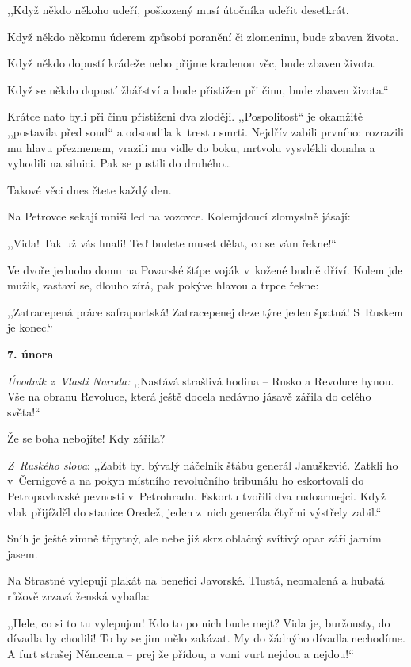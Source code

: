 ,,Když někdo někoho udeří, poškozený musí útočníka udeřit desetkrát.

Když někdo někomu úderem způsobí poranění či zlomeninu, bude zbaven života.

Když někdo dopustí krádeže nebo přijme kradenou věc, bude zbaven života.

Když se někdo dopustí žhářství a bude přistižen při činu, bude zbaven života.``

Krátce nato byli při činu přistiženi dva zloději. ,,Pospolitost`` je okamžitě ,,postavila před soud`` a odsoudila k trestu smrti. Nejdřív zabili prvního: rozrazili mu hlavu přezmenem, vrazili mu vidle do boku, mrtvolu vysvlékli donaha a vyhodili na silnici. Pak se pustili do druhého\ldots

Takové věci dnes čtete každý den.

Na Petrovce sekají mniši led na vozovce. Kolemjdoucí zlomyslně jásají:

,,Vida! Tak už vás hnali! Teď budete muset dělat, co se vám řekne!``

Ve dvoře jednoho domu na Povarské štípe voják v kožené budně dříví. Kolem jde mužik, zastaví se, dlouho zírá, pak pokýve hlavou a trpce řekne:

,,Zatracepená práce safraportská! Zatracepenej dezeltýre jeden špatná! S Ruskem je konec.``

\medskip

\noindent
\textbf{7. února} 	

\noindent
\textit{Úvodník z Vlasti Naroda:} ,,Nastává strašlivá hodina -- Rusko a Revoluce hynou. Vše na obranu Revoluce, která ještě docela nedávno jásavě zářila do celého světa!``

Že se boha nebojíte! Kdy zářila?

\medskip

\noindent
\textit{Z Ruského slova}: ,,Zabit byl bývalý náčelník štábu generál Januškevič. Zatkli ho v Černigově a na pokyn místního revolučního tribunálu ho eskortovali do Petropavlovské pevnosti v Petrohradu. Eskortu tvořili dva rudoarmejci. Když vlak přijížděl do stanice Oredež, jeden z nich generála čtyřmi výstřely zabil.``

Sníh je ještě zimně třpytný, ale nebe již skrz oblačný svítivý opar září jarním jasem.

Na Strastné vylepují plakát na benefici Javorské. Tlustá, neomalená a hubatá  růžově zrzavá ženská vybafla:

,,Hele, co si to tu vylepujou! Kdo to po nich bude mejt? Vida je, buržousty, do dívadla by chodili! To by se jim mělo zakázat. My do žádnýho dívadla nechodíme. A furt strašej Němcema -- prej že přídou, a voni vurt nejdou a nejdou!``


